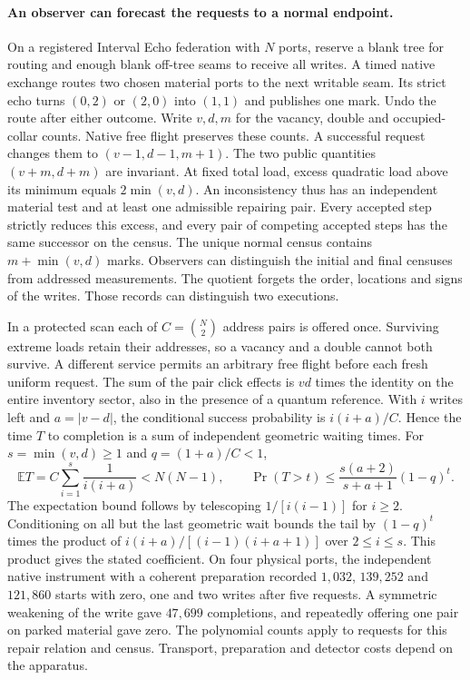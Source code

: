 \documentclass[11pt]{article}
\theoremstyle{remark}
\theoremstyle{plain}
\begin{document}
\paragraph{An observer can forecast the requests to a normal endpoint.}
On a registered Interval Echo federation with $N$ ports, reserve a blank
tree for routing and enough blank off-tree seams to receive all writes.
A timed native exchange routes two chosen material ports to the next
writable seam. Its strict echo turns $(0,2)$ or $(2,0)$ into $(1,1)$
and publishes one mark. Undo the route after either outcome. Write $v,d,m$
for the vacancy, double and occupied-collar counts. Native free flight
preserves these counts. A successful request changes them to
$(v-1,d-1,m+1)$. The two public quantities $(v+m,d+m)$ are invariant.
At fixed total load, excess quadratic load above its minimum equals
$2\min(v,d)$. An inconsistency thus has an independent material test
and at least one admissible repairing pair. Every accepted step
strictly reduces this excess, and every pair of competing accepted
steps has the same successor on the census. The unique normal census
contains $m+\min(v,d)$ marks. Observers can distinguish the initial
and final censuses from addressed measurements. The quotient forgets
the order, locations and signs of the writes. Those records can
distinguish two executions.

In a protected scan each of $C=\binom{N}{2}$ address pairs is offered
once. Surviving extreme loads retain their addresses, so a vacancy and a
double cannot both survive. A different service permits an arbitrary
free flight before each fresh uniform request. The sum of the pair
click effects is $vd$ times the identity on the entire inventory
sector, also in the presence of a quantum reference. With $i$ writes
left and $a=|v-d|$, the conditional success probability is
$i(i+a)/C$. Hence the time $T$ to completion is a sum of independent
geometric waiting times. For $s=\min(v,d)\ge1$ and $q=(1+a)/C<1$,
\[
 \mathbb{E}T=C\sum_{i=1}^{s}\frac{1}{i(i+a)}<N(N-1),
 \qquad
 \Pr(T>t)\le \frac{s(a+2)}{s+a+1}(1-q)^t .
\]
The expectation bound follows by telescoping $1/[i(i-1)]$ for $i\ge2$.
Conditioning on all but the last geometric wait bounds the tail by
$(1-q)^t$ times the product of $i(i+a)/[(i-1)(i+a+1)]$ over $2\le i\le s$.
This product gives the stated coefficient. On four physical ports, the
independent native instrument with a coherent preparation recorded
$1{,}032$, $139{,}252$ and $121{,}860$ starts with zero, one and two
writes after five requests. A symmetric weakening of the write gave
$47{,}699$ completions, and repeatedly offering one pair on parked
material gave zero. The polynomial counts apply to requests for this
repair relation and census. Transport, preparation and detector
costs depend on the apparatus.
\end{document}
